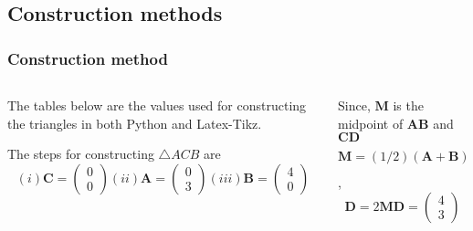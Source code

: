 \documentclass{beamer}
\renewcommand{\vec}[1]{\mathbf{#1}}
\begin{document}
\subsection*{Construction methods}
\begin{frame}[fragile]
\footnotesize
\frametitle{Construction method}
\begin{columns}
\begin{column}{0.5\textwidth}
The tables below are the values used for constructing the triangles in both Python and Latex-Tikz.
\begin{table}[htbp]
\centering
\caption{\tiny To construct $\triangle ACB$}
\end{table}
The steps for constructing $\triangle ACB$ are
\newline
$$(i)\vec{C}= \begin{pmatrix}0\\0\end{pmatrix}
(ii)\vec{A}=\begin{pmatrix}0\\3\end{pmatrix}
(iii)\vec{B}=\begin{pmatrix}4\\0\end{pmatrix}$$
\end{column}
\begin{column}{0.5\textwidth}
Since, $\vec{M}$ is the midpoint of $\vec{AB}$ and $\vec{CD}$
\\
$$\vec{M}=(1/2)(\vec{A}+\vec{B})
\vec{M}=\begin{pmatrix}2\\1.5\end{pmatrix}$$,
\\
$$\vec{D}=2\vec{M}
\vec{D}=\begin{pmatrix}4\\3\end{pmatrix}$$
\begin{table}[H]
\centering
\resizebox{0.5\textwidth}{!}{\begin{minipage}{\textwidth}

\end{minipage}}
\end{table}
\end{column}
\end{columns}
\end{frame}
\end{document}
